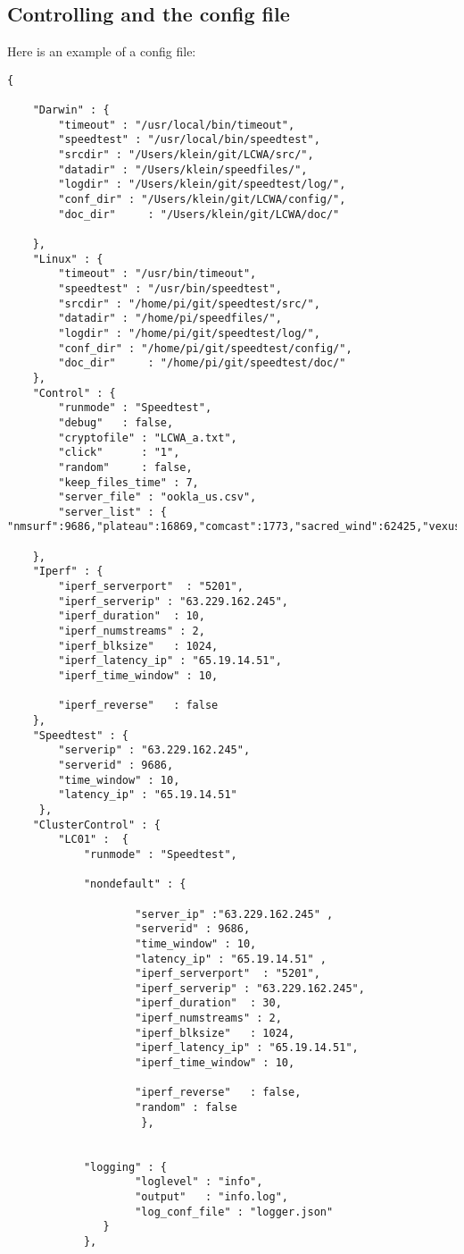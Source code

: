 \documentclass[11pt]{article}
\begin{document}
\subsection{Controlling and the config file}
Here is an example of a config file:
\begin{verbatim}
{

    "Darwin" : {
        "timeout" : "/usr/local/bin/timeout",
        "speedtest" : "/usr/local/bin/speedtest",
        "srcdir" : "/Users/klein/git/LCWA/src/",
        "datadir" : "/Users/klein/speedfiles/",
        "logdir" : "/Users/klein/git/speedtest/log/",
        "conf_dir" : "/Users/klein/git/LCWA/config/",
        "doc_dir"     : "/Users/klein/git/LCWA/doc/"

    },
    "Linux" : {
        "timeout" : "/usr/bin/timeout",
        "speedtest" : "/usr/bin/speedtest",
        "srcdir" : "/home/pi/git/speedtest/src/",
        "datadir" : "/home/pi/speedfiles/",
        "logdir" : "/home/pi/git/speedtest/log/",
        "conf_dir" : "/home/pi/git/speedtest/config/",
        "doc_dir"     : "/home/pi/git/speedtest/doc/"
    },
    "Control" : {
        "runmode" : "Speedtest",
        "debug"   : false,
        "cryptofile" : "LCWA_a.txt",
        "click"      : "1",
        "random"     : false,
        "keep_files_time" : 7,
        "server_file" : "ookla_us.csv",
        "server_list" : { "nmsurf":9686,"plateau":16869,"comcast":1773,"sacred_wind":62425,"vexus":62294,"santa_rosa":43754,"windstream":45706}

    },
    "Iperf" : {
        "iperf_serverport"  : "5201",
        "iperf_serverip" : "63.229.162.245",
        "iperf_duration"  : 10,
        "iperf_numstreams" : 2,
        "iperf_blksize"   : 1024,
        "iperf_latency_ip" : "65.19.14.51",
        "iperf_time_window" : 10,

        "iperf_reverse"   : false
    },
    "Speedtest" : {
        "serverip" : "63.229.162.245",
        "serverid" : 9686,
        "time_window" : 10,
        "latency_ip" : "65.19.14.51" 
     },
    "ClusterControl" : {
        "LC01" :  {
            "runmode" : "Speedtest",

            "nondefault" : {

                    "server_ip" :"63.229.162.245" ,
                    "serverid" : 9686,
                    "time_window" : 10,
                    "latency_ip" : "65.19.14.51" ,
                    "iperf_serverport"  : "5201",
                    "iperf_serverip" : "63.229.162.245",
                    "iperf_duration"  : 30,
                    "iperf_numstreams" : 2,
                    "iperf_blksize"   : 1024,
                    "iperf_latency_ip" : "65.19.14.51",
                    "iperf_time_window" : 10,
            
                    "iperf_reverse"   : false,
                    "random" : false
                     },

                    
            "logging" : {
                    "loglevel" : "info",
                    "output"   : "info.log",
                    "log_conf_file" : "logger.json"
               }
            },

\end{verbatim}
\end{document}
